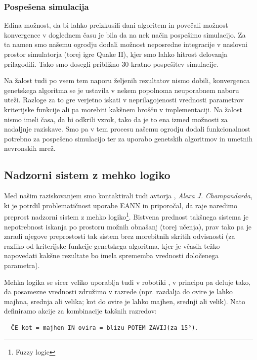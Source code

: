 \documentclass[a4paper,10pt]{article}
\begin{document}
\subsubsection{Pospešena simulacija}

Edina možnost, da bi lahko preizkusili dani algoritem in povečali možnost konvergence v doglednem času je bila da na nek način pospešimo simulacijo. Za ta namen smo našemu ogrodju dodali možnost neposredne integracije v naslovni prostor simulatorja (torej igre Quake II), kjer smo lahko hitrost delovanja prilagodili. Tako smo dosegli približno 30-kratno pospešitev simulacije.

Na žalost tudi po vsem tem naporu željenih rezultatov nismo dobili, konvergenca genetskega algoritma se je ustavila v nekem popolnoma neuporabnem naboru uteži. Razloge za to gre verjetno iskati v neprilagojenosti vrednosti parametrov kriterijske funkcije ali pa morebiti kakšnem hrošču v implementaciji. Na žalost nismo imeli časa, da bi odkrili vzrok, tako da je to ena izmed možnosti za nadaljnje raziskave. Smo pa v tem procesu našemu ogrodju dodali funkcionalnost potrebno za pospešeno simulacijo ter za uporabo genetskih algoritmov in umetnih nevronskih mrež.

\subsection{Nadzorni sistem z mehko logiko}

Med našim raziskovanjem smo kontaktirali tudi avtorja \cite{champandard02}, \textit{Alexa J. Champandarda}, ki je potrdil problematičnost uporabe EANN in priporočal, da raje naredimo preprost nadzorni sistem z mehko logiko\footnote{Fuzzy logic}. Bistvena prednost takšnega sistema je nepotrebnost iskanja po prostoru možnih obnašanj (torej učenja), prav tako pa je zaradi njegove preprostosti tak sistem brez morebitnih skritih odvisnosti (za razliko od kriterijske funkcije genetskega algoritma, kjer je včasih težko napovedati kakšne rezultate bo imela sprememba vrednosti določenega parametra).

Mehka logika se sicer veliko uporablja tudi v robotiki \cite{grayston06}, v principu pa deluje tako, da posamezne vrednosti združimo v razrede (npr. razdalja do ovire je lahko majhna, srednja ali velika; kot do ovire je lahko majhen, srednji ali velik). Nato definiramo akcije za kombinacije takšnih razredov:

\begin{verbatim}
  ČE kot = majhen IN ovira = blizu POTEM ZAVIJ(za 15°).
\end{verbatim}
\end{document}
